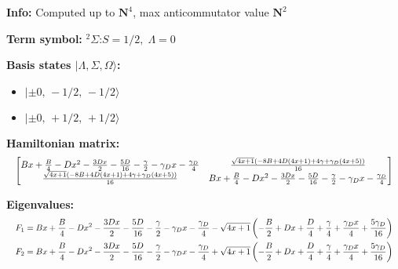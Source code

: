 \documentclass[12pt]{article}
\begin{document}
\pagestyle{empty}

\textbf{Info:} Computed up to $\bm{N}^4$, max anticommutator value $\bm{N}^2$

\textbf{Term symbol:} $^2\Sigma$:\quad $S=1/2,\;\Lambda=0$

\textbf{Basis states $\lvert \Lambda,\Sigma,\Omega\rangle$:}
\begin{itemize}
\item $\lvert \pm0,\,-1/2,\,-1/2\rangle$
\item $\lvert \pm0,\,+1/2,\,+1/2\rangle$
\end{itemize}

\textbf{Hamiltonian matrix:}
\begin{equation*}
\resizebox{\linewidth}{!}{$
\left[\begin{matrix}B x + \frac{B}{4} - D x^{2} - \frac{3 D x}{2} - \frac{5 D}{16} - \frac{\gamma}{2} - \gamma_{D} x - \frac{\gamma_{D}}{4} & \frac{\sqrt{4 x + 1} \left(- 8 B + 4 D \left(4 x + 1\right) + 4 \gamma + \gamma_{D} \left(4 x + 5\right)\right)}{16}\\\frac{\sqrt{4 x + 1} \left(- 8 B + 4 D \left(4 x + 1\right) + 4 \gamma + \gamma_{D} \left(4 x + 5\right)\right)}{16} & B x + \frac{B}{4} - D x^{2} - \frac{3 D x}{2} - \frac{5 D}{16} - \frac{\gamma}{2} - \gamma_{D} x - \frac{\gamma_{D}}{4}\end{matrix}\right]
$}
\end{equation*}

\textbf{Eigenvalues:}
\begin{equation*}
\resizebox{\linewidth}{!}{$
\begin{aligned}
F_{1} &= B x + \frac{B}{4} - D x^{2} - \frac{3 D x}{2} - \frac{5 D}{16} - \frac{\gamma}{2} - \gamma_{D} x - \frac{\gamma_{D}}{4} - \sqrt{4 x + 1} \left(- \frac{B}{2} + D x + \frac{D}{4} + \frac{\gamma}{4} + \frac{\gamma_{D} x}{4} + \frac{5 \gamma_{D}}{16}\right) \\
F_{2} &= B x + \frac{B}{4} - D x^{2} - \frac{3 D x}{2} - \frac{5 D}{16} - \frac{\gamma}{2} - \gamma_{D} x - \frac{\gamma_{D}}{4} + \sqrt{4 x + 1} \left(- \frac{B}{2} + D x + \frac{D}{4} + \frac{\gamma}{4} + \frac{\gamma_{D} x}{4} + \frac{5 \gamma_{D}}{16}\right) \\
\end{aligned}
$}
\end{equation*}
\end{document}
